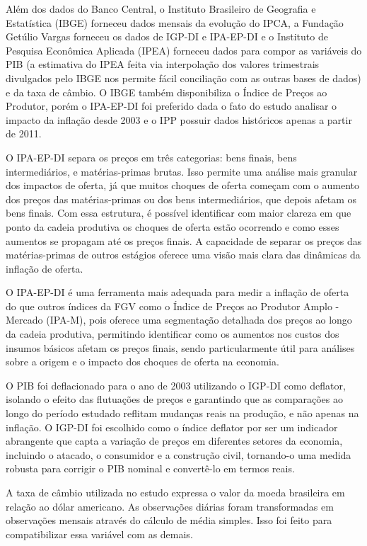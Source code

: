 \documentclass[12pt,oneside,a4paper,chapter=TITLE,english,brazil,sumario=abnt-6027-2012]{abntex2}
\begin{document}
Além dos dados do Banco Central, o Instituto Brasileiro de Geografia e Estatística (IBGE) forneceu dados mensais da evolução do IPCA, a Fundação Getúlio Vargas forneceu os dados de IGP-DI e IPA-EP-DI e o Instituto de Pesquisa Econômica Aplicada (IPEA) forneceu dados para compor as variáveis do PIB (a estimativa do IPEA feita via interpolação dos valores trimestrais divulgados pelo IBGE nos permite fácil conciliação com as outras bases de dados) e da taxa de câmbio. O IBGE também disponibiliza o Índice de Preços ao Produtor, porém o IPA-EP-DI foi preferido dada o fato do estudo analisar o impacto da inflação desde 2003 e o IPP possuir dados históricos apenas a partir de 2011.

O IPA-EP-DI separa os preços em três categorias: bens finais, bens intermediários, e matérias-primas brutas. Isso permite uma análise mais granular dos impactos de oferta, já que muitos choques de oferta começam com o aumento dos preços das matérias-primas ou dos bens intermediários, que depois afetam os bens finais.
Com essa estrutura, é possível identificar com maior clareza em que ponto da cadeia produtiva os choques de oferta estão ocorrendo e como esses aumentos se propagam até os preços finais. A capacidade de separar os preços das matérias-primas de outros estágios oferece uma visão mais clara das dinâmicas da inflação de oferta.

O IPA-EP-DI é uma ferramenta mais adequada para medir a inflação de oferta do que outros índices da FGV como o Índice de Preços ao Produtor Amplo - Mercado (IPA-M), pois oferece uma segmentação detalhada dos preços ao longo da cadeia produtiva, permitindo identificar como os aumentos nos custos dos insumos básicos afetam os preços finais, sendo particularmente útil para análises sobre a origem e o impacto dos choques de oferta na economia.

O PIB foi deflacionado para o ano de 2003 utilizando o IGP-DI como deflator, isolando o efeito das flutuações de preços e garantindo que as comparações ao longo do período estudado reflitam mudanças reais na produção, e não apenas na inflação. O IGP-DI foi escolhido como o índice deflator por ser um indicador abrangente que capta a variação de preços em diferentes setores da economia, incluindo o atacado, o consumidor e a construção civil, tornando-o uma medida robusta para corrigir o PIB nominal e convertê-lo em termos reais.

A taxa de câmbio utilizada no estudo expressa o valor da moeda brasileira em relação ao dólar americano. As observações diárias foram transformadas em observações mensais através do cálculo de média simples. Isso foi feito para compatibilizar essa variável com as demais.
\end{document}
